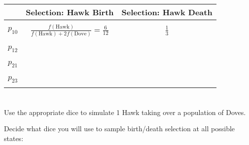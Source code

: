 \documentclass{article}
\begin{document}
\begin{center}
    \begin{tabular}{r|c|c}
        \toprule
                     & Selection: Hawk Birth   & Selection: Hawk Death   \\
        \midrule
                     &                                                                          & \\
        \(p_{10}\)   & \(\frac{f(\text{Hawk})}{f(\text{Hawk}) + 2f(\text{Dove})}=\frac{6}{12}\) & \(\frac{1}{3}\)\\
                     &                                                                          & \\
                     &                                                                          & \\
        \(p_{12}\)   &                                                                          & \\
                     &                                                                          & \\
        \midrule
                     &                                                                          & \\
        \(p_{21}\)   &                                                                          & \\
                     &                                                                          & \\
                     &                                                                          & \\
        \(p_{23}\)   &                                                                          & \\
                     &                                                                          & \\
        \bottomrule
    \end{tabular}
\end{center}

\newpage
\section*{}

Use the appropriate dice to simulate 1 Hawk taking over a population of Doves.

Decide what dice you will use to sample birth/death selection at all possible
states:
\end{document}
